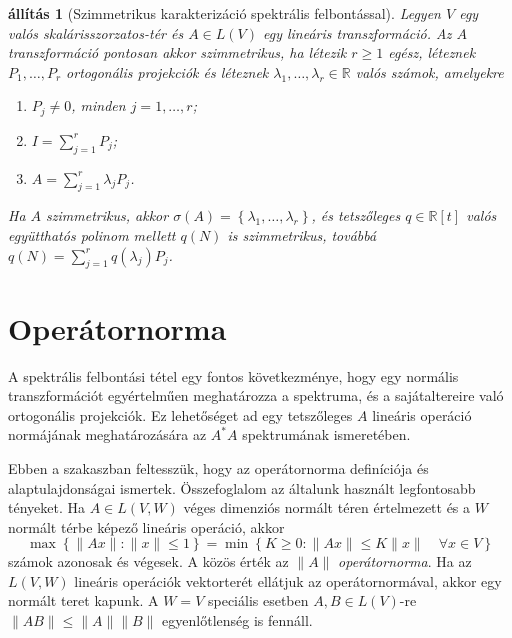 \documentclass[9pt, a4paper, showtrims]{memoir}
\theoremstyle{plain}
\newtheorem{proposition}{állítás}[chapter]
\theoremstyle{remark}
\theoremstyle{definition}
\begin{document}
\begin{proposition}[Szimmetrikus karakterizáció spektrális felbontással]
	Legyen $V$ egy valós ska\-lá\-ris\-szor\-za\-tos-tér
	és $A\in L\left( V \right)$ egy lineáris transzformáció.
	Az $A$ transzformáció pontosan akkor szimmetrikus,
	ha létezik $r\geq 1$ egész, léteznek $P_1,\ldots,P_r$ ortogonális projekciók és
	léteznek $\lambda_1,\ldots,\lambda_r\in\mathbb{R}$ valós számok,
	amelyekre
	\begin{enumerate}
		\item $P_j\neq 0$, minden $j=1,\ldots,r$;
		\item $I=\sum_{j=1}^rP_j$;
		\item $A=\sum_{j=1}^r\lambda_jP_j$.
	\end{enumerate}
	Ha $A$ szimmetrikus,
	akkor $\sigma\left( A \right)=\left\{ \lambda_1,\ldots,\lambda_r \right\}$,
	és tetszőleges $q\in\mathbb{R}[t]$ valós együtthatós polinom mellett
	$q\left( N \right)$ is szimmetrikus,
	továbbá
	$q\left( N \right)=\sum_{j=1}^rq\left( \lambda_j \right)P_j$.
\end{proposition}




\section{Operátornorma}
A spektrális felbontási tétel egy fontos következménye,
hogy egy normális transzformációt egyértelműen meghatározza a spektruma, és a sajátaltereire való
ortogonális projekciók.
Ez lehetőséget ad egy tetszőleges $A$ lineáris operáció normájának meghatározására az $A^\ast A$ spektrumának ismeretében.

Ebben a szakaszban feltesszük,
hogy az operátornorma definíciója és alaptulajdonságai ismertek.
Összefoglalom az általunk használt legfontosabb tényeket.
Ha $A\in L\left( V,W \right)$ véges dimenziós normált téren értelmezett és a $W$ normált térbe képező lineáris operáció,
akkor
\[
	\max\left\{ \|Ax\|:\|x\|\leq 1 \right\}
	=
	\min\left\{ K\geq 0:\|Ax\|\leq K\|x\|\quad\forall x\in V \right\}
\]
számok azonosak és végesek. A közös érték az $\|A\|$ \emph{operátornorma}.
Ha az $L\left( V,W \right)$ lineáris operációk vektorterét ellátjuk az operátornormával,
akkor egy normált teret kapunk.
A $W=V$ speciális esetben $A,B\in L\left( V \right)$-re $\|AB\|\leq \|A\|\|B\|$ egyenlőtlenség is fennáll.
\end{document}
